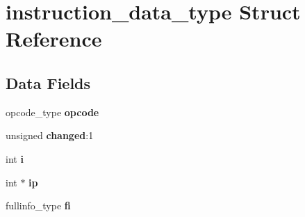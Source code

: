 \section{instruction\_\-data\_\-type Struct Reference}
\label{structinstruction__data__type}
\subsection*{Data Fields}
\begin{DoxyCompactItemize}
\item 
opcode\_\-type {\bfseries opcode}\label{structinstruction__data__type_ac8a6433d4f3d988011c3636dc45beba7}

\item 
unsigned {\bfseries changed}:1\label{structinstruction__data__type_aa3967fe98bea3c6ef547869088335968}

\item 
int {\bfseries i}\label{structinstruction__data__type_a4b9f68c8709de0bc88accf26086a0276}

\item 
int $\ast$ {\bfseries ip}\label{structinstruction__data__type_a149b0a6b44365e46fb9a4eed917f2f57}

\item 
fullinfo\_\-type {\bfseries fi}\label{structinstruction__data__type_ad14fda17cee4ac8d25ca5c5435a4a073}

\end{DoxyCompactItemize}

